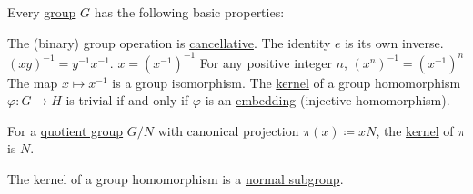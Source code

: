 \begin{proposition}\label{thm:def:group}
  Every \hyperref[def:group]{group} \( G \) has the following basic properties:
  \begin{thmenum}
     The (binary) group operation is \hyperref[def:magma/cancellative]{cancellative}.
     The identity \( e \) is its own inverse.
     \( (xy)^{-1} = y^{-1} x^{-1} \).
     \( x = (x^{-1})^{-1} \)
     For any positive integer \( n \), \( (x^n)^{-1} = (x^{-1})^n \)
     The map \( x \mapsto x^{-1} \) is a group isomorphism.
     The \hyperref[def:group/kernel]{kernel} of a group homomorphism \( \varphi: G \to H \) is trivial if and only if \( \varphi \) is an \hyperref[def:first_order_homomorphism_invertibility/embedding]{embedding} (injective homomorphism).

     For a \hyperref[def:group/quotient]{quotient group} \( G / N \) with canonical projection \( \pi(x) \coloneqq xN \), the \hyperref[def:group/kernel]{kernel} of \( \pi \) is \( N \).

     The kernel of a group homomorphism is a \hyperref[thm:normal_subgroup_equivalences]{normal subgroup}.
  \end{thmenum}
\end{proposition}
